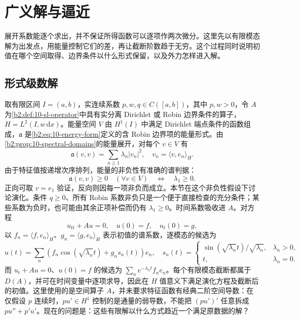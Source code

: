 \section{广义解与逼近}
\label{b2:sec:1004}

展开系数能逐个求出，并不保证所得函数可以逐项作两次微分。这里先以有限模态解为出发点，用能量控制它们的差，再让截断阶数趋于无穷。这个过程同时说明初值在哪个空间取得、边界条件以什么形式保留，以及外力怎样进入解。

\subsection{形式级数解}
\label{b2:subsec:100401}

取有限区间 \(I=(a,b)\)，实连续系数 \(p,w,q\in C([a,b])\)，其中 \(p,w>0\)，令 \(A\) 为\cref{b2:def:10-sl-operator}中具有实分离 Dirichlet 或 Robin 边界条件的算子，\(H=L^2(I,w\,\mathrm{d}x)\)。能量空间 \(V\) 由 \(H^1(I)\) 中满足 Dirichlet 端点条件的函数组成，\(\mathfrak a\) 是\eqref{b2:eq:10-energy-form}定义的含 Robin 边界项的能量形式。由\cref{b2:prop:10-spectral-domains}的能量展开，对每个 \(v\in V\) 有
\[
 \mathfrak a(v,v)=\sum_{n\geq1}\lambda_n|v_n|^2,
 \quad v_n=\langle v,e_n\rangle_H.
\]
由于特征值按递增次序排列，能量的非负性有准确的谱判据：
\begin{equation}\label{b2:eq:10-nonnegative-spectrum}
 \mathfrak a(v,v)\geq0\quad(\forall v\in V)
 \quad\Longleftrightarrow\quad\lambda_1\geq0.
\end{equation}
正向可取 \(v=e_1\) 验证，反向则因每一项非负而成立。本节在这个非负性假设下讨论演化。条件 \(q\geq0\)、所有 Robin 系数非负只是一个便于直接检查的充分条件；某些系数为负时，也可能由其余正项补偿而仍有 \(\lambda_1\geq0\)。时间系数吸收进 \(A\)。对方程
\[
 u_{tt}+Au=0,
 \quad u(0)=f,
 \quad u_t(0)=g,
\]
以 \(f_n=\langle f,e_n\rangle_H\)、\(g_n=\langle g,e_n\rangle_H\) 表示初值的谱系数，逐模态的候选为
\begin{equation}\label{b2:eq:10-wave-series}
 u(t)=\sum_n\left(f_n\cos(\sqrt{\lambda_n}t)
 +g_n s_n(t)\right)e_n,
 \quad s_n(t)=
 \begin{cases}
 \sin(\sqrt{\lambda_n}t)/\sqrt{\lambda_n},&\lambda_n>0,\\
 t,&\lambda_n=0.
 \end{cases}
\end{equation}
而 \(u_t+Au=0\)、\(u(0)=f\) 的候选为 \(\sum_ne^{-\lambda_nt}f_ne_n\)。每个有限模态截断都属于 \(D(A)\)，并可在时间变量中逐项求导，因此在 \(H\) 值意义下满足演化方程及截断后的初值。这里使用的是空间算子 \(A\)，并未要求特征函数有经典二阶空间导数：在仅假设 \(p\) 连续时，\(pu'\in H^1\) 控制的是通量的弱导数，不能把 \((pu')'\) 任意拆成 \(pu''+p'u'\)。现在的问题是：这些有限解以什么方式趋近一个满足原数据的解？

